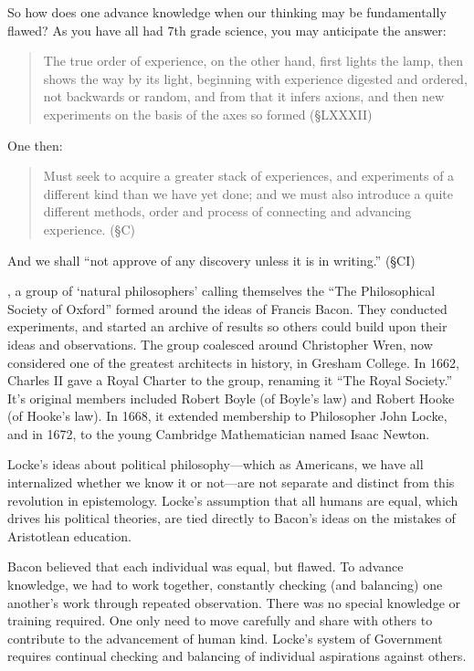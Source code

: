 So how does one advance knowledge when our thinking may be fundamentally flawed? As you have all had 7th grade science, you may anticipate the answer: 

\begin{quote}

The true order of experience, on the other hand, first lights the lamp, then shows the way by its light, beginning with experience digested and ordered, not backwards or random, and from that it infers axions, and then new experiments on the basis of the axes so formed (\S LXXXII)
\end{quote}

One then:

\begin{quote}

Must seek to acquire a greater stack of experiences, and experiments of a different kind than we have yet done; and we must also introduce a quite different methods, order and process of connecting and advancing experience. (\S C)
\end{quote}

And we shall ``not approve of any discovery unless it is in writing.'' (\S CI)

, a group of `natural philosophers' calling themselves the ``The Philosophical Society of Oxford'' formed around the ideas of Francis Bacon. They conducted experiments, and started an archive of results so others could build upon their ideas and observations. The group coalesced around Christopher Wren, now considered one of the greatest architects in history, in Gresham College. In 1662, Charles II gave a Royal Charter to the group, renaming it ``The Royal Society.'' It's original members included Robert Boyle (of Boyle's law) and Robert Hooke (of Hooke's law). In 1668, it extended membership to Philosopher John Locke, and in 1672, to the young Cambridge Mathematician named Isaac Newton.

Locke's ideas about political philosophy---which as Americans, we have all internalized whether we know it or not---are not separate and distinct from this revolution in epistemology. Locke's assumption that all humans are equal, which drives his political theories, are tied directly to Bacon's ideas on the mistakes of Aristotlean education. 

Bacon believed that each individual was equal, but flawed. To advance knowledge, we had to work together, constantly checking (and balancing) one another's work through repeated observation. There was no special knowledge or training required. One only need to move carefully and share with others to contribute to the advancement of human kind. Locke's system of Government requires continual checking and balancing of individual aspirations against others.

